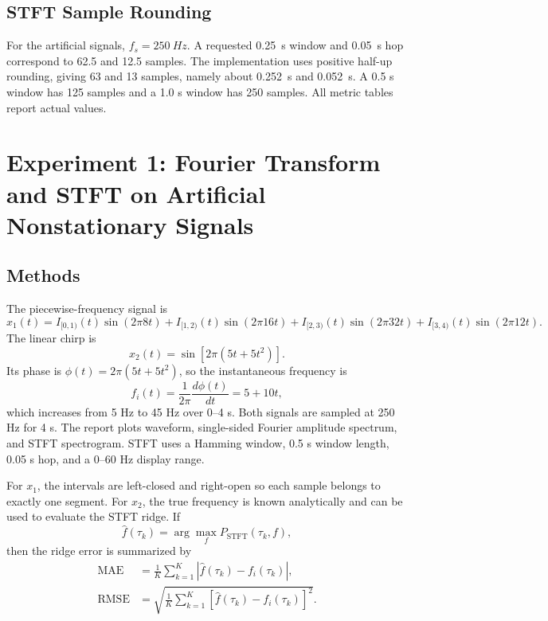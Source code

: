 \documentclass[a4paper,11pt]{article}
\numberwithin{equation}{section}
\begin{document}
\subsection{STFT Sample Rounding}
For the artificial signals, $f_s=\SI{250}{Hz}$. A requested \SI{0.25}{s} window and \SI{0.05}{s} hop correspond to 62.5 and 12.5 samples. The implementation uses positive half-up rounding, giving 63 and 13 samples, namely about \SI{0.252}{s} and \SI{0.052}{s}. A 0.5 s window has 125 samples and a 1.0 s window has 250 samples. All metric tables report actual values.

\clearpage
\section{Experiment 1: Fourier Transform and STFT on Artificial Nonstationary Signals}
\subsection{Methods}
The piecewise-frequency signal is
\begin{equation}
x_1(t)=I_{[0,1)}(t)\sin(2\pi 8t)+I_{[1,2)}(t)\sin(2\pi 16t)+I_{[2,3)}(t)\sin(2\pi 32t)+I_{[3,4)}(t)\sin(2\pi 12t).
\end{equation}
The linear chirp is
\begin{equation}
x_2(t)=\sin\left[2\pi(5t+5t^2)\right].
\end{equation}
Its phase is $\phi(t)=2\pi(5t+5t^2)$, so the instantaneous frequency is
\begin{equation}
f_i(t)=\frac{1}{2\pi}\frac{d\phi(t)}{dt}=5+10t,
\end{equation}
which increases from 5 Hz to 45 Hz over 0--4 s. Both signals are sampled at 250 Hz for 4 s. The report plots waveform, single-sided Fourier amplitude spectrum, and STFT spectrogram. STFT uses a Hamming window, 0.5 s window length, 0.05 s hop, and a 0--60 Hz display range.

For $x_1$, the intervals are left-closed and right-open so each sample belongs to exactly one segment. For $x_2$, the true frequency is known analytically and can be used to evaluate the STFT ridge. If
\begin{equation}
\hat f(\tau_k)=\arg\max_f P_{\mathrm{STFT}}(\tau_k,f),
\end{equation}
then the ridge error is summarized by
\begin{align}
\mathrm{MAE}&=\frac{1}{K}\sum_{k=1}^K|\hat f(\tau_k)-f_i(\tau_k)|,\\
\mathrm{RMSE}&=\sqrt{\frac{1}{K}\sum_{k=1}^K[\hat f(\tau_k)-f_i(\tau_k)]^2}.
\end{align}
\end{document}
